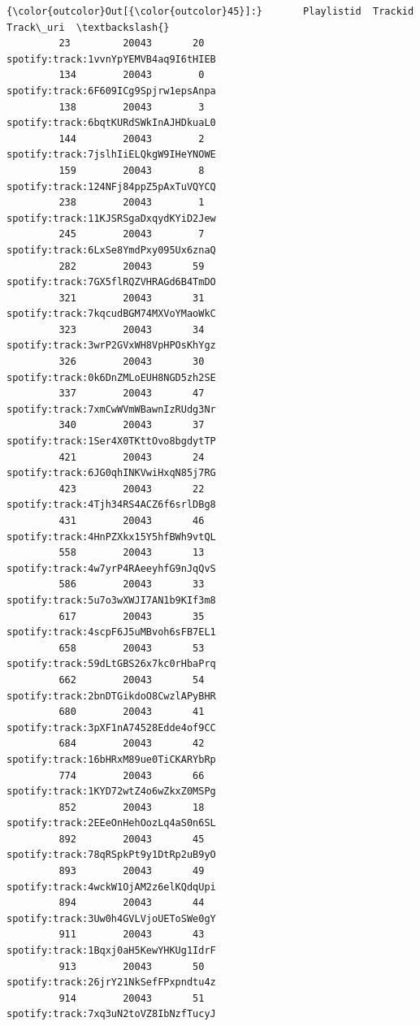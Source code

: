 \documentclass[11pt]{article}
\begin{document}
\begin{Verbatim}[commandchars=\\\{\}]
{\color{outcolor}Out[{\color{outcolor}45}]:}       Playlistid  Trackid                             Track\_uri  \textbackslash{}
         23         20043       20  spotify:track:1vvnYpYEMVB4aq9I6tHIEB   
         134        20043        0  spotify:track:6F609ICg9Spjrw1epsAnpa   
         138        20043        3  spotify:track:6bqtKURdSWkInAJHDkuaL0   
         144        20043        2  spotify:track:7jslhIiELQkgW9IHeYNOWE   
         159        20043        8  spotify:track:124NFj84ppZ5pAxTuVQYCQ   
         238        20043        1  spotify:track:11KJSRSgaDxqydKYiD2Jew   
         245        20043        7  spotify:track:6LxSe8YmdPxy095Ux6znaQ   
         282        20043       59  spotify:track:7GX5flRQZVHRAGd6B4TmDO   
         321        20043       31  spotify:track:7kqcudBGM74MXVoYMaoWkC   
         323        20043       34  spotify:track:3wrP2GVxWH8VpHPOsKhYgz   
         326        20043       30  spotify:track:0k6DnZMLoEUH8NGD5zh2SE   
         337        20043       47  spotify:track:7xmCwWVmWBawnIzRUdg3Nr   
         340        20043       37  spotify:track:1Ser4X0TKttOvo8bgdytTP   
         421        20043       24  spotify:track:6JG0qhINKVwiHxqN85j7RG   
         423        20043       22  spotify:track:4Tjh34RS4ACZ6f6srlDBg8   
         431        20043       46  spotify:track:4HnPZXkx15Y5hfBWh9vtQL   
         558        20043       13  spotify:track:4w7yrP4RAeeyhfG9nJqQvS   
         586        20043       33  spotify:track:5u7o3wXWJI7AN1b9KIf3m8   
         617        20043       35  spotify:track:4scpF6J5uMBvoh6sFB7EL1   
         658        20043       53  spotify:track:59dLtGBS26x7kc0rHbaPrq   
         662        20043       54  spotify:track:2bnDTGikdoO8CwzlAPyBHR   
         680        20043       41  spotify:track:3pXF1nA74528Edde4of9CC   
         684        20043       42  spotify:track:16bHRxM89ue0TiCKARYbRp   
         774        20043       66  spotify:track:1KYD72wtZ4o6wZkxZ0MSPg   
         852        20043       18  spotify:track:2EEeOnHehOozLq4aS0n6SL   
         892        20043       45  spotify:track:78qRSpkPt9y1DtRp2uB9yO   
         893        20043       49  spotify:track:4wckW1OjAM2z6elKQdqUpi   
         894        20043       44  spotify:track:3Uw0h4GVLVjoUEToSWe0gY   
         911        20043       43  spotify:track:1Bqxj0aH5KewYHKUg1IdrF   
         913        20043       50  spotify:track:26jrY21NkSefFPxpndtu4z   
         914        20043       51  spotify:track:7xq3uN2toVZ8IbNzfTucyJ   

\end{Verbatim}
\end{document}
